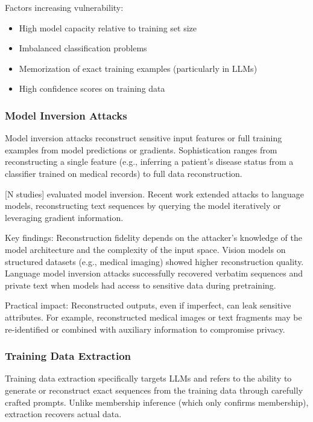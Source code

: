 \documentclass[11pt,a4paper]{article}
\begin{document}
Factors increasing vulnerability:
\begin{itemize}
\item High model capacity relative to training set size
\item Imbalanced classification problems
\item Memorization of exact training examples (particularly in LLMs)
\item High confidence scores on training data
\end{itemize}

\subsubsection{Model Inversion Attacks}

Model inversion attacks reconstruct sensitive input features or full training examples from model predictions or gradients. Sophistication ranges from reconstructing a single feature (e.g., inferring a patient's disease status from a classifier trained on medical records) to full data reconstruction.

[N studies] evaluated model inversion. Recent work extended attacks to language models, reconstructing text sequences by querying the model iteratively or leveraging gradient information.

Key findings: Reconstruction fidelity depends on the attacker's knowledge of the model architecture and the complexity of the input space. Vision models on structured datasets (e.g., medical imaging) showed higher reconstruction quality. Language model inversion attacks successfully recovered verbatim sequences and private text when models had access to sensitive data during pretraining.

Practical impact: Reconstructed outputs, even if imperfect, can leak sensitive attributes. For example, reconstructed medical images or text fragments may be re-identified or combined with auxiliary information to compromise privacy.

\subsubsection{Training Data Extraction}

Training data extraction specifically targets LLMs and refers to the ability to generate or reconstruct exact sequences from the training data through carefully crafted prompts. Unlike membership inference (which only confirms membership), extraction recovers actual data.
\end{document}
